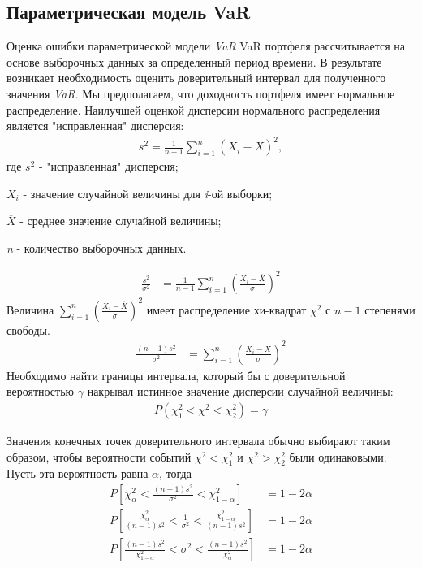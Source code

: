\documentclass[financial_risks_lectures.tex]{subfiles}
\begin{document}
\subsection{Параметрическая модель VaR}
\begin{frame}[shrink=10]{Оценка ошибки параметрической модели \textit{VaR}} 
VaR портфеля рассчитывается на основе выборочных данных за определенный период времени. В результате возникает необходимость оценить доверительный интервал для полученного значения \textit{VaR}. 
Мы предполагаем, что доходность портфеля имеет нормальное распределение. Наилучшей оценкой дисперсии нормального распределения является "исправленная" дисперсия:
\begin{align}
s^2=\frac{1}{n-1}\sum\limits_{i=1}^n(X_i-\overline{X})^2,
\end{align}
где $s^2$ - "исправленная" дисперсия;

$X_i$ - значение случайной величины для \textit{i}-ой выборки; 

$\overline{X}$ - среднее значение случайной величины; 

\textit{n} - количество выборочных данных.

\end{frame}
\begin{frame}[shrink=10]
\begin{align*}
\frac{s^2}{\sigma^2} & =\frac{1}{n-1}\sum_{i=1}^n\left(\frac{X_i-\overline{X}}{\sigma}\right)^2
\end{align*}
Величина $\sum\limits_{i=1}^n\left(\frac{X_i-\overline{X}}{\sigma}\right)^2$ имеет распределение хи-квадрат $\chi^2$ с $n-1$ степенями свободы. 
\begin{align}
\frac{(n-1)s^2}{\sigma^2} & =\sum_{i=1}^n\left(\frac{X_i-\overline{X}}{\sigma}\right)^2
\end{align}
Необходимо найти границы интервала, который бы с доверительной вероятностью $\gamma$ накрывал истинное значение дисперсии случайной величины:
\begin{align}
P(\chi_1^2<\chi^2<\chi_2^2)=\gamma
\end{align}
\end{frame}
\begin{frame}
Значения конечных точек доверительного интервала обычно выбирают таким образом, чтобы вероятности событий $\chi^2<\chi_1^2$ и $\chi^2>\chi_2^2$ были одинаковыми. Пусть эта вероятность равна $\alpha$, тогда
\begin{align}
P\left[\chi_{\alpha}^2<\frac{(n-1)s^2}{\sigma^2}<\chi_{1-\alpha}^2\right] & =1-2\alpha \nonumber \\
P\left[\frac{\chi_{\alpha}^2}{(n-1)s^2}<\frac{1}{\sigma^2}<\frac{\chi_{1-\alpha}^2}{(n-1)s^2}\right] & =1-2\alpha \nonumber \\
P\left[\frac{(n-1)s^2}{\chi_{1-\alpha}^2}<\sigma^2<\frac{(n-1)s^2}{\chi_{\alpha}^2}\right] & =1-2\alpha
\end{align}
\end{frame}
\end{document}
